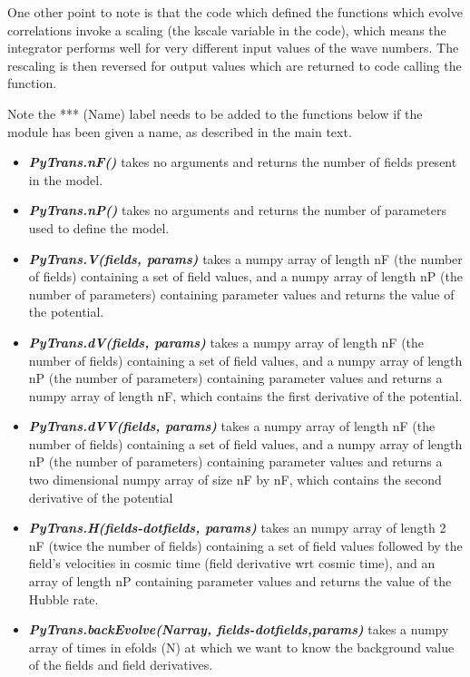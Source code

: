 \documentclass[10pt,
amsmath,amssymb,
aps,prd,nofootinbib,eqsecnum,a4paper]{revtex4}
\begin{document}
One other point to note is that the code which defined the functions which evolve correlations invoke a scaling (the kscale variable in the code), 
which means the integrator performs well for very different input values of the wave numbers. The rescaling is then reversed 
for output values which are returned to code calling the function.

Note the *** (Name) label needs to be added to the functions below if the module has been given a name, as described in the main text.

\begin{itemize}
\item    {\it \bf PyTrans.nF()} takes no arguments and returns the number of fields present in the model.  
\item    {\it \bf PyTrans.nP()} takes no arguments and returns the number of parameters used to define the model.
\item    {\it \bf PyTrans.V(fields, params)} takes a numpy array of length nF (the number of fields) containing a set 
    of field values, and a numpy array of length nP (the number of parameters) containing parameter values  and returns the value of the potential.
\item  {\it \bf PyTrans.dV(fields, params)} takes a numpy array of length nF (the number of fields) containing a set 
    of field values, and a numpy array of length nP (the number of parameters) containing parameter values and returns a numpy array of length nF, which contains the first derivative of the potential.
\item  {\it \bf PyTrans.dVV(fields, params)} takes a numpy array of length nF (the number of fields) containing a set 
    of field values, and a numpy array of length nP (the number of parameters) containing parameter values 
    and returns a two dimensional 
    numpy array of size nF by nF, which   
    contains the second derivative of the potential
\item  {\it \bf PyTrans.H(fields-dotfields, params)} takes an numpy array of length 2 nF (twice the number of 
    fields) containing a set of field values followed by the field's velocities in cosmic time 
    (field derivative wrt cosmic time), and an array of length nP  containing parameter values 
    and returns the value of the Hubble rate.
\item  {\it \bf PyTrans.backEvolve(Narray, fields-dotfields,params)} takes a numpy array of times in efolds (N) 
    at which we want to know the background value of the fields and field derivatives. 

\end{itemize}
\end{document}
